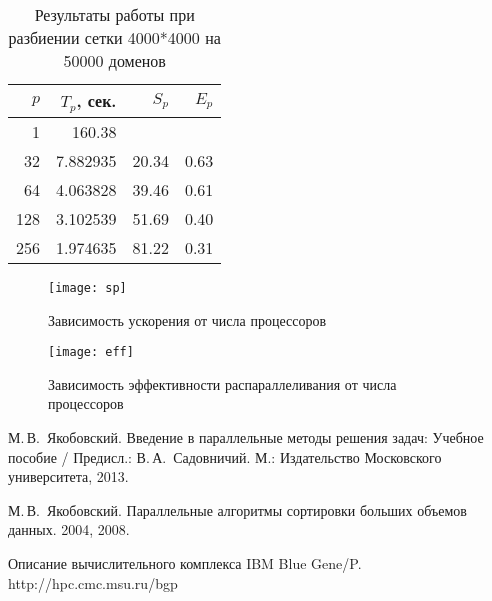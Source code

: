 \documentclass[oneside,final,14pt]{extreport}
\begin{document}
\begin{table}[h]
\centering
\begin{tabular}{|r|r|r|r|}\hline
$p$    & $T_p$, сек. & $S_p$ & $E_p$ \\ \hline
1      & 160.38      &       &       \\ \hline
32     & 7.882935    & 20.34 & 0.63  \\ \hline
64     & 4.063828    & 39.46 & 0.61  \\ \hline
128    & 3.102539    & 51.69 & 0.40  \\ \hline
256    & 1.974635    & 81.22 & 0.31  \\ \hline
\end{tabular}
\caption{Результаты работы при разбиении сетки 4000*4000 на 50000 доменов}
\label{tab4000}
\end{table}

\begin{figure}[h]
    \centering
    \texttt{[image: sp]}
    \caption{Зависимость ускорения от числа процессоров}
    \label{speed}
\end{figure}

\begin{figure}[h]
    \centering
    \texttt{[image: eff]}
    \caption{Зависимость эффективности распараллеливания от числа процессоров}
    \label{eff}
\end{figure}

\begin{thebibliography}{0}
        М.\,В.~Якобовский.
        Введение в параллельные методы решения задач: Учебное пособие / Предисл.: В.\,А.~Садовничий.
        М.: Издательство Московского университета, 2013.

        М.\,В.~Якобовский.
        Параллельные алгоритмы сортировки больших объемов данных.
        2004, 2008.

        Описание вычислительного комплекса IBM Blue Gene/P.
        http://hpc.cmc.msu.ru/bgp
\end{thebibliography}

\newpage
\appendix
\end{document}
